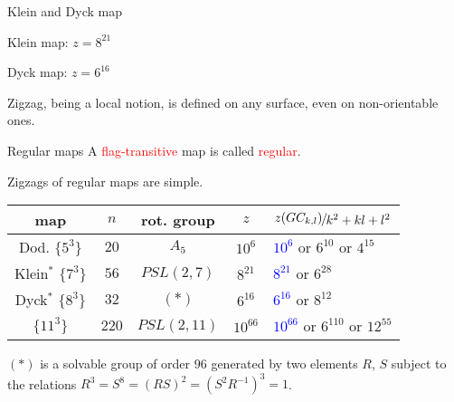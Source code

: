 \documentclass[%
pdf,
colorBG,
slideColor,
]{prosper}
\def\QuotS#1#2{\leavevmode\kern-.0em\raise.2ex\hbox{$#1$}\kern-.1em/\kern-.1em\lower.25ex\hbox{$#2$}}
\def\QuotS#1#2{\leavevmode\kern-.0em\raise.2ex\hbox{$#1$}\kern-.1em/\kern-.1em\lower.25ex\hbox{$#2$}}
\begin{document}
\begin{slide}{Klein and Dyck map}
\begin{center}
\setlength{\unitlength}{1cm}
\begin{minipage}[t]{4.0cm}
\epsfxsize=3.9cm
\par
Klein map: $z=8^{21}$
\end{minipage}
\hspace{3cm}
\begin{minipage}[t]{4.0cm}
\epsfxsize=3.9cm
\par
Dyck map: $z=6^{16}$
\end{minipage}
\end{center}

\vspace{3mm}

Zigzag, being a local notion, is defined on any surface, even on non-orientable ones.
\end{slide}




\begin{slide}{Regular maps}
A \textcolor{red}{flag-transitive} map is called \textcolor{red}{regular}.

Zigzags of regular maps are simple.
\vspace{3mm}
\begin{center}
\begin{tabular}{||c|c|c|c|l||}
\hline
\hline
map   &$n$  &rot. group       &$z$    &\multicolumn{1}{|c||}{$\QuotS{z(GC_{k,l})}{k^2+kl+l^2}$}\\
\hline
Dod. $\{5^3\}$   &$20$ &$A_5$  &$10^6$         &\textcolor{blue}{$10^6$} or $6^{10}$ or $4^{15}$\\
Klein${}^*$ $\{7^3\}$ &$56$ &$PSL(2,7)$      &$8^{21}$       &\textcolor{blue}{$8^{21}$} or $6^{28}$\\
Dyck${}^*$ $\{8^3\}$  &$32$ &$(*)$   &$6^{16}$       &\textcolor{blue}{$6^{16}$} or $8^{12}$\\
$\{11^3\}$               &$220$&$PSL(2,11)$    &$10^{66}$       &\textcolor{blue}{$10^{66}$} or $6^{110}$ or $12^{55}$\\
\hline
\hline
\end{tabular}
\end{center}
$(*)$ is a solvable group of order $96$ generated by two elements $R$, $S$ subject to the relations $R^3=S^8=(RS)^2=(S^2R^{-1})^3=1$.



\end{slide}
\end{document}
